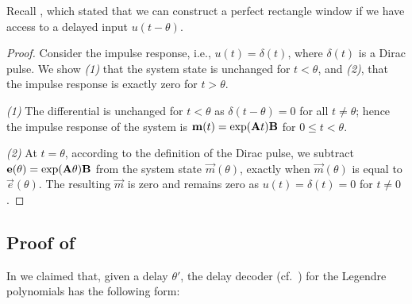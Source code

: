 Recall , which stated that we can construct a perfect rectangle window if we have access to a delayed input $u(t - \theta)$.

\LemRectangleWindow*

\begin{proof}
Consider the impulse response, i.e., $u(t) = \delta(t)$, where $\delta(t)$ is a Dirac pulse.
We show \emph{(1)} that the system state is unchanged for $t < \theta$, and \emph{(2)}, that the impulse response is exactly zero for $t > \theta$.

\emph{(1)} The differential is unchanged for $t < \theta$ as $\delta(t - \theta) = 0$ for all $t \neq \theta$; hence the impulse response of the system is $\mathbf{m}(t) = \exp(\mathbf{A} t) \mathbf{B}$ for $0 \leq t < \theta$.

\emph{(2)} At $t = \theta$, according to the definition of the Dirac pulse, we subtract $\mathbf{e}(\theta) = \exp(\mathbf{A} \theta) \mathbf{B}$ from the system state $\vec m(\theta)$, exactly when $\vec m(\theta)$ is equal to $\vec e(\theta)$.
The resulting $\vec m$ is zero and remains zero as $u(t) = \delta(t) = 0$ for  $t \neq 0$.
\end{proof}

\subsection{Proof of }
\label{app:legendre_delay_decoder_proof}

In  we claimed that, given a delay $\theta'$, the delay decoder (cf.~) for the Legendre polynomials has the following form:

\LemLegendreDelayDecoder*

